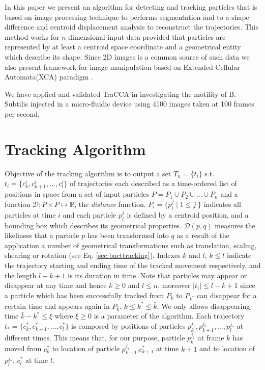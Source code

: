 \documentclass[conference]{IEEEtran}
\begin{document}
In this paper we present an algorithm for detecting and tracking particles that is based on image processing technique to performs segmentation and to a shape difference and centroid displacement analysis to reconstruct the trajectories. 
This method works for $n$-dimensional input data provided that particles are represented by at least a centroid space coordinate and a geometrical entity which describe its shape. 
Since 2D images is a common source of such data we also present framework for image-manipulation based on Extended Cellular Automata(XCA) paradigm .

We have applied and validated TraCCA in investigating the motility of B. Subtilis injected in a micro-fluidic device using 4100 images taken at 100 frames per second. 



\section{Tracking Algorithm}
Objective of the tracking algorithm is to output a 
set $ T_n = \{ t_i \}$  s.t.  $t_i=\{ c^i_k,c^i_{k+1},\ldots,c^i_l \} $ 
of trajectories each described as a time-ordered list of positions  in space from a set of input 
particles $P=P_1 \cup P_2 \cup \ldots \cup P_n$ and a function $\mathcal{D} :  P \times P \mapsto \mathbb{R}$, 
the \textit{distance} function. $P_i = \{p^j_i \; | \; 1 \leq j\; \}$ indicates all particles at time $i$ and each particle $p_i^j$ is defined by a centroid position, and a bounding box which describes its geometrical properties.
$\mathcal{D}(p,q)$ measures the likeliness that a particle $p$ has been transformed into $q$ as a result of the application a number of geometrical transformations such as translation, scaling, shearing or rotation (see Eq. \ref{sec:bacttracking}). 
Indexes $k$ and $l$, $k \leq l$ indicate the trajectory starting and ending time of the tracked movement respectively, and the length $l-k+1$ is its duration in time.
Note that particles may appear or disappear at any time and hence $k\geq 0$ and $l \leq n$, moreover $|t_i| \leq l-k+1$ since a particle which has been successfully tracked
 from  $P_k$ to $P_{k^*} $ can disappear for a certain time and appears again in $P_{\bar{k}}$, $k \leq k^* \leq \bar{k}$. We only allows disappearing time $\bar{k}-k^* \leq \xi$ where $\xi \geq 0$ is a parameter of the algorithm. 
Each trajectory  $t_*=\{ c^*_k,c^*_{k+1},\ldots,c^*_l \} $ is composed by  positions of particles $p^{j_1}_k,p^{j_2}_{k+1},\ldots,p^{j_*}_l$ at different times. 
This means that, for our purpose, particle $p^{j_1}_k$ at frame $k$ has moved from $c^*_k$ to location of particle $p^{j_2}_{k+1}$,$c^*_{k+1}$ at time ${k+1}$ and to location of $p^{j_*}_{l}$, $c^*_l$ at time $l$. 
\end{document}
